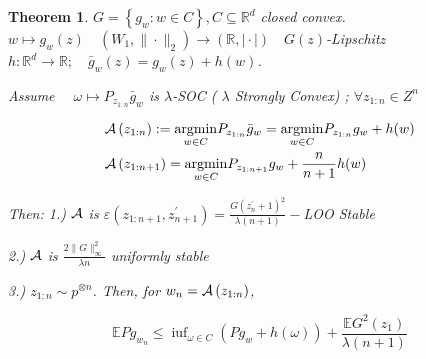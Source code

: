 \documentclass[twoside]{article}
\newcounter{lecnum}
\newtheorem{theorem}{Theorem}[lecnum]
\begin{document}
\begin{theorem}

$G=\left\{g_{w}: w \in C\right\}, C \subseteq \mathbb{R}^{d}$ closed  convex. 
$w \mapsto g_{w}(z) \quad\left(W_{1}, \|\cdot\|_{2}\right) \rightarrow \left(\mathbb{R} ,  \mid \cdot \mid \right) \quad G(z)$-Lipschitz \\ $h: \mathbb{R}^{d} \rightarrow \mathbb{R} ; \quad \bar{g}_{w}(z)=g_{w}(z)+h(w)$.

\noindent Assume $\quad \omega \mapsto P_{z_{1: n}} \bar{g}_{w}$ is $\lambda$-SOC ( $\lambda$ Strongly Convex) ; $\forall z_{1: n} \in Z^{n}$

$$
\begin{aligned}
& \mathcal{A} \left(z_{1: n}\right):=\underset{w \in C}{\operatorname{argmin}} P_{z_{1:n}} \bar{g}_{w}=\underset{w \in C}{\operatorname{argmin}} P_{z_{1:n}} g_{w}+h(w) \\
& \mathcal{A} \left(z_{1: n+1}\right)=\underset{w \in C}{\operatorname{argmin}} P_{z_{1: n+1}} g_{w}+\frac{n}{n+1} h(w)
\end{aligned}
$$

Then: 
1.) $\mathcal{A}$ is $\varepsilon\left(z_{1: n+1}, z_{n+1}^{\prime}\right)=\frac{G\left(z_{n}^{\prime}+1\right)^{2}}{\lambda(n+1)}-$LOO Stable

2.) $\mathcal{A}$ is $\frac{2\|G\|_{\infty}^{2}}{\lambda n}$ uniformly stable

3.) $z_{1: n} \sim p^{\otimes n}$. Then, for $w_{n}=\mathcal{A}\left(z_{1: n}\right)$,

$$
\mathbb{E} P g_{w_{n}} \leqslant \operatorname{iuf}_{\omega \in C}\left(P g_{w}+h(\omega)\right)+\frac{\mathbb{E} G^2\left(z_{1}\right)}{\lambda(n+1)}
$$

\end{theorem}
\end{document}
